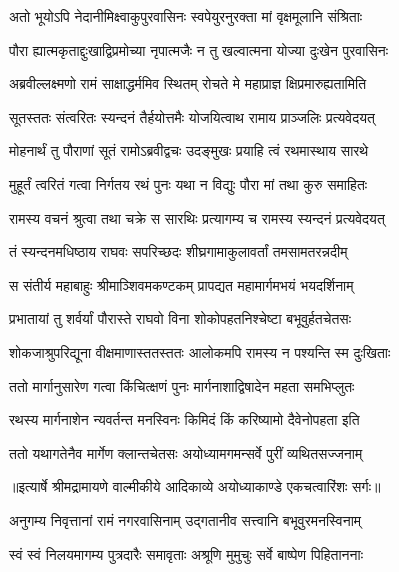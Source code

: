 \twolineshloka
{अतो भूयोऽपि नेदानीमिक्ष्वाकुपुरवासिनः}
{स्वपेयुरनुरक्ता मां वृक्षमूलानि संश्रिताः} %

\twolineshloka
{पौरा ह्यात्मकृताद्दुःखाद्विप्रमोच्या नृपात्मजैः}
{न तु खल्वात्मना योज्या दुःखेन पुरवासिनः} %

\twolineshloka
{अब्रवील्लक्ष्मणो रामं साक्षाद्धर्ममिव स्थितम्}
{रोचते मे महाप्राज्ञ क्षिप्रमारुह्यतामिति} %

\twolineshloka
{सूतस्ततः संत्वरितः स्यन्दनं तैर्हयोत्तमैः}
{योजयित्वाथ रामाय प्राञ्जलिः प्रत्यवेदयत्} %

\twolineshloka
{मोहनार्थं तु पौराणां सूतं रामोऽब्रवीद्वचः}
{उदङ्मुखः प्रयाहि त्वं रथमास्थाय सारथे} %

\twolineshloka
{मुहूर्तं त्वरितं गत्वा निर्गतय रथं पुनः}
{यथा न विद्युः पौरा मां तथा कुरु समाहितः} %

\twolineshloka
{रामस्य वचनं श्रुत्वा तथा चक्रे स सारथिः}
{प्रत्यागम्य च रामस्य स्यन्दनं प्रत्यवेदयत्} %

\twolineshloka
{तं स्यन्दनमधिष्ठाय राघवः सपरिच्छदः}
{शीघ्रगामाकुलावर्तां तमसामतरन्नदीम्} %

\twolineshloka
{स संतीर्य महाबाहुः श्रीमाञ्शिवमकण्टकम्}
{प्रापद्यत महामार्गमभयं भयदर्शिनाम्} %

\twolineshloka
{प्रभातायां तु शर्वर्यां पौरास्ते राघवो विना}
{शोकोपहतनिश्चेष्टा बभूवुर्हतचेतसः} %

\twolineshloka
{शोकजाश्रुपरिद्यूना वीक्षमाणास्ततस्ततः}
{आलोकमपि रामस्य न पश्यन्ति स्म दुःखिताः} %

\twolineshloka
{ततो मार्गानुसारेण गत्वा किंचित्क्षणं पुनः}
{मार्गनाशाद्विषादेन महता समभिप्लुतः} %

\twolineshloka
{रथस्य मार्गनाशेन न्यवर्तन्त मनस्विनः}
{किमिदं किं करिष्यामो दैवेनोपहता इति} %

\twolineshloka
{ततो यथागतेनैव मार्गेण क्लान्तचेतसः}
{अयोध्यामगमन्सर्वे पुरीं व्यथितसज्जनाम्} %


{॥इत्यार्षे श्रीमद्रामायणे वाल्मीकीये आदिकाव्ये अयोध्याकाण्डे एकचत्वारिंशः सर्गः॥}


\twolineshloka
{अनुगम्य निवृत्तानां रामं नगरवासिनाम्}
{उद्गतानीव सत्त्वानि बभूवुरमनस्विनाम्} %

\twolineshloka
{स्वं स्वं निलयमागम्य पुत्रदारैः समावृताः}
{अश्रूणि मुमुचुः सर्वे बाष्पेण पिहिताननाः} %

